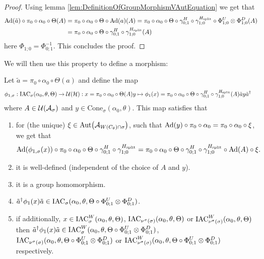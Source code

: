 \documentclass[11pt,a4paper,twoside]{article}
\numberwithin{equation}{section}
\begin{document}
	\begin{proof}
		Using lemma \ref{lem:DefinitionOfGroupMorphismVAutEquation} we get that
		\begin{align}
			\Ad{\tilde{a}}\circ\pi_0\circ\alpha_0\circ\Theta(A)&=\pi_0\circ\alpha_0\circ\Theta\circ\Ad{a}(A)=\pi_0\circ\alpha_0\circ\Theta\circ\gamma^H_{0;1}\circ\gamma^{\Hsplit}_{1;0}\circ\Phi^U_{1;0}\otimes\Phi^D_{1;0}(A)\\
			&=\pi_0\circ\alpha_0\circ\Theta\circ\gamma^H_{0;1}\circ\gamma^{\Hsplit}_{1;0}(A)
		\end{align}
		here $\Phi_{1;0}=\Phi_{0;1}^{-1}$. This concludes the proof.
	\end{proof}
	We will then use this property to define a morphism:
	\begin{lemma}\label{lem:DefinitionOfGroupMorphism}
		Let $\tilde{a}=\pi_0\circ\alpha_0\circ\Theta(a)$ and define the map
		\begin{align}
			\phi_{1,\sigma}&:\textrm{IAC}_\sigma(\alpha_0,\theta,\Theta) \rightarrow \mathcal U(\mathcal H):x=\pi_0\circ\alpha_0\circ\Theta(A)y\mapsto \phi_1(x)=\pi_0\circ\alpha_0\circ\Theta\circ\gamma^H_{0;1}\circ\gamma^{{H_{\text{split}}}}_{1;0}(A)\tilde{a}y\tilde{a}^\dagger
		\end{align}
		where $A\in\mathcal U(\mathcal A_\sigma)$ and $y\in\textrm{Cone}_\sigma(\alpha_0,\theta)$. This map satisfies that
		\begin{enumerate}
			\item  for (the unique) $\xi\in\Aut{\AA_{W(C_\theta)\cap\sigma}}$, such that $\Ad{y}\circ\pi_0\circ\alpha_0=\pi_0\circ\alpha_0\circ\xi$, we get that
			\begin{equation}\label{eq:ConditionDefinitionOfGroupMorphism}
				\Ad{\phi_{1,\sigma}(x)}\circ\pi_0\circ\alpha_0\circ\Theta\circ\gamma^H_{0;1}\circ\gamma^{\Hsplit}_{1;0}=\pi_0\circ\alpha_0\circ\Theta\circ\gamma^H_{0;1}\circ\gamma^{\Hsplit}_{1;0}\circ\Ad{A}\circ\xi.
			\end{equation}
			\item it is well-defined (independent of the choice of $A$ and $y$).
			\item it is a group homomorphism.
			\item $\tilde{a}^\dagger \phi_1(x)\tilde{a}\in\textrm{IAC}_\sigma(\alpha_0,\theta,\Theta\circ \Phi^U_{0;1}\otimes\Phi^D_{0;1})$.
			\item if additionally, $x\in \textrm{IAC}_\sigma^W(\alpha_0,\theta,\Theta)$, $\textrm{IAC}_{\nu^{\sigma}(\sigma)}(\alpha_0,\theta,\Theta)$ or $\textrm{IAC}_{\nu^{\sigma}(\sigma)}^W (\alpha_0,\theta,\Theta)$ then  $\tilde{a}^\dagger \phi_1(x)\tilde{a}\in\textrm{IAC}_\sigma^W(\alpha_0,\theta,\Theta\circ \Phi^U_{0;1}\otimes\Phi^D_{0;1})$, $\textrm{IAC}_{\nu^{\sigma}(\sigma)}(\alpha_0,\theta,\Theta\circ \Phi^U_{0;1}\otimes\Phi^D_{0;1})$ or $\textrm{IAC}_{\nu^{\sigma}(\sigma)}^W (\alpha_0,\theta,\Theta\circ \Phi^U_{0;1}\otimes\Phi^D_{0;1})$ respectively.
		\end{enumerate}
	\end{lemma}
\end{document}
